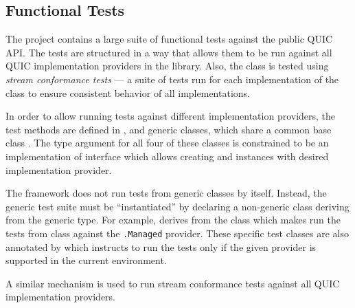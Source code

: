 \subsection{Functional Tests}

The  project contains a large suite of functional tests against the public
QUIC API\@. The tests are structured in a way that allows them to be run against all QUIC
implementation providers in the library. Also, the \QuicStream{} class is tested using
\textit{stream conformance tests} --- a suite of tests run for each implementation of the \Stream{}
class to ensure consistent behavior of all implementations.

In order to allow running tests against different implementation providers, the test methods are
defined in \QuicListenerTests{}, \QuicConnectionTests{} and \QuicStreamTests{} generic classes,
which share a common base class \QuicTestBase{}. The type argument for all four of these classes is
constrained to be an implementation of  interface which allows
creating \QuicListener{} and \QuicConnection{} instances with desired implementation provider.

The \xUnit{} framework does not run tests from generic classes by itself. Instead, the generic test
suite must be ``instantiated'' by declaring a non-generic class deriving from the generic type. For
example,  derives from the
 class which makes
\xUnit{} run the tests from \QuicStreamTests{} class against the
\texttt{\QuicImplementationProviders{}.Managed} provider. These specific test classes are also
annotated by  which instructs \xUnit{} to run the tests only if the
given provider is supported in the current environment.

A similar mechanism is used to run stream conformance tests against all QUIC implementation
providers.

